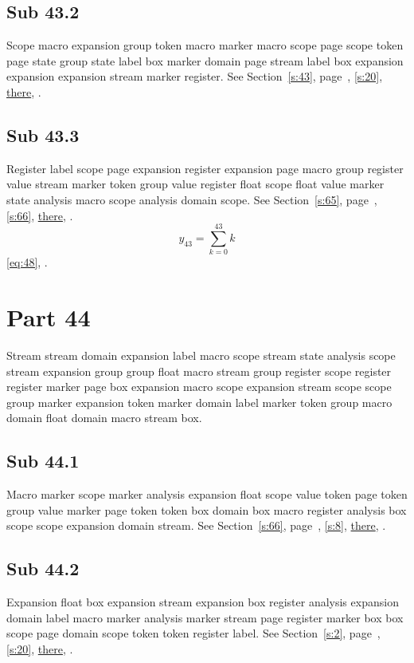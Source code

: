 \documentclass[11pt]{article}
\begin{document}
\subsection{Sub 43.2}\label{ss:43.2} Scope macro expansion group token macro marker macro scope page scope token page state group state label box marker domain page stream label box expansion expansion expansion stream marker register. See Section~\ref{s:43}, page~\pageref{ss:33.1}, \cref{s:20}, \hyperref[s:75]{there}, \cite{k56,k117}.
\subsection{Sub 43.3}\label{ss:43.3} Register label scope page expansion register expansion page macro group register value stream marker token group value register float scope float value marker state analysis macro scope analysis domain scope. See Section~\ref{s:65}, page~\pageref{ss:50.1}, \cref{s:66}, \hyperref[s:47]{there}, \cite{k87,k30}.
\begin{equation}y_{43}=\sum_{k=0}^{43}k\label{eq:43}\end{equation} \eqref{eq:48}, .
\section{Part 44}\label{s:44}
Stream stream domain expansion label macro scope stream state analysis scope stream expansion group group float macro stream group register scope register register marker page box expansion macro scope expansion stream scope scope group marker expansion token marker domain label marker token group macro domain float domain macro stream box.
\subsection{Sub 44.1}\label{ss:44.1} Macro marker scope marker analysis expansion float scope value token page token group value marker page token token box domain box macro register analysis box scope scope expansion domain stream. See Section~\ref{s:66}, page~\pageref{ss:9.2}, \cref{s:8}, \hyperref[s:51]{there}, \cite{k96,k31}.
\subsection{Sub 44.2}\label{ss:44.2} Expansion float box expansion stream expansion box register analysis expansion domain label macro marker analysis marker stream page register marker box box scope page domain scope token token register label. See Section~\ref{s:2}, page~\pageref{ss:43.2}, \cref{s:20}, \hyperref[s:65]{there}, \cite{k49,k1}.
\end{document}
